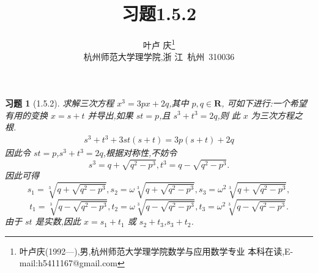 \documentclass[a4paper]{article}
\newtheorem*{exercise}{习题}
\begin{document}
\title{\huge{\bf{习题1.5.2}}} \author{\small{叶卢
    庆\footnote{叶卢庆(1992---),男,杭州师范大学理学院数学与应用数学专业
      本科在读,E-mail:h5411167@gmail.com}}\\{\small{杭州师范大学理学院,浙
      江~杭州~310036}}}
\maketitle
\begin{exercise}[1.5.2]
求解三次方程 $x^3=3px+2q$,其中 $p,q\in \mathbf{R}$, 可如下进行:一个希望有用的变换 $x=s+t$ 并导出,如果 $st=p$,且 $s^3+t^3=2q$,则
  此 $x$ 为三次方程之根.
    \begin{align*}
      s^3+t^3+3st(s+t)=3p(s+t)+2q
    \end{align*}
因此令 $st=p$,$s^3+t^3=2q$,根据对称性,不妨令
$$
s^3=q+\sqrt{q^2-p^3},t^3=q-\sqrt{q^2-p^3}.
$$
因此可得
$$
s_{1}=\sqrt[3]{q+\sqrt{q^2-p^3}},s_2=\omega
\sqrt[3]{q+\sqrt{q^2-p^3}},s_3=\omega^2 \sqrt[3]{q+\sqrt{q^2-p^3}},
$$
$$
t_1=\sqrt[3]{q-\sqrt{q^2-p^3}},t_2=\omega\sqrt[3]{q-\sqrt{q^2-p^3}},t_3=\omega^2\sqrt[3]{q-\sqrt{q^2-p^3}}.
$$
由于 $st$ 是实数,因此 $x=s_1+t_1$ 或 $s_2+t_3$,$s_3+t_2$.
\end{exercise}
\end{document}
